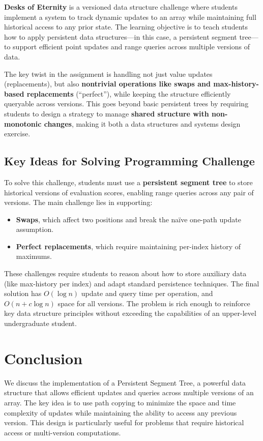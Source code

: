 \documentclass{fairmeta}
\numberwithin{equation}{section}
\begin{document}
\textbf{Desks of Eternity} is a versioned data structure challenge where students implement a system to track dynamic updates to an array while maintaining full historical access to any prior state. The learning objective is to teach students how to apply persistent data structures—in this case, a persistent segment tree—to support efficient point updates and range queries across multiple versions of data.

The key twist in the assignment is handling not just value updates (replacements), but also \textbf{nontrivial operations like swaps and max-history-based replacements} (``perfect''), while keeping the structure efficiently queryable across versions. This goes beyond basic persistent trees by requiring students to design a strategy to manage \textbf{shared structure with non-monotonic changes}, making it both a data structures and systems design exercise.

\subsection*{Key Ideas for Solving Programming Challenge}

To solve this challenge, students must use a \textbf{persistent segment tree} to store historical versions of evaluation scores, enabling range queries across any pair of versions. The main challenge lies in supporting:
\begin{itemize}
    \item \textbf{Swaps}, which affect two positions and break the naïve one-path update assumption.
    \item \textbf{Perfect replacements}, which require maintaining per-index history of maximums.
\end{itemize}

These challenges require students to reason about how to store auxiliary data (like max-history per index) and adapt standard persistence techniques. The final solution has $O(\log n)$ update and query time per operation, and $O(n + c \log n)$ space for all versions. The problem is rich enough to reinforce key data structure principles without exceeding the capabilities of an upper-level undergraduate student.

\section{Conclusion}

We discuss the implementation of a Persistent Segment Tree, a powerful data structure that allows efficient updates and queries across multiple versions of an array. The key idea is to use path copying to minimize the space and time complexity of updates while maintaining the ability to access any previous version. This design is particularly useful for problems that require historical access or multi-version computations.
\end{document}
